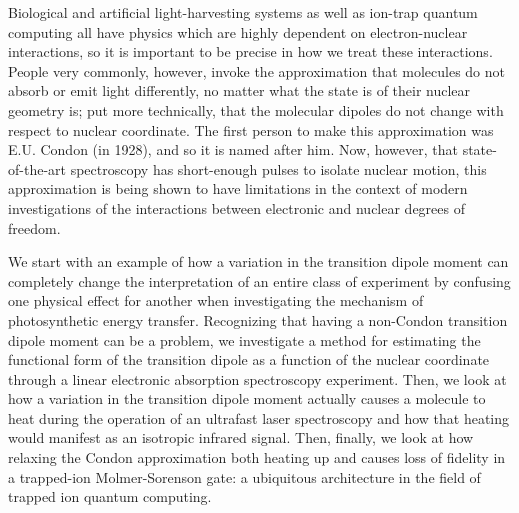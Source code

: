 
Biological and artificial light-harvesting systems as well as ion-trap quantum computing all have physics which are highly dependent on electron-nuclear interactions, so it is important to be precise in how we treat these interactions.  People very commonly, however, invoke the approximation that molecules do not absorb or emit light differently, no matter what the state is of their nuclear geometry is; put more technically, that the molecular dipoles do not change with respect to nuclear coordinate.  The first person to make this approximation was E.U. Condon (in 1928), and so it is named after him.  Now, however, that state-of-the-art spectroscopy has short-enough pulses to isolate nuclear motion, this approximation is being shown to have limitations in the context of modern investigations of the interactions between electronic and nuclear degrees of freedom.

We start with an example of how a variation in the transition dipole moment can completely change the interpretation of an entire class of experiment by confusing one physical effect for another when investigating the mechanism of photosynthetic energy transfer.  Recognizing that having a non-Condon transition dipole moment can be a problem, we investigate a method for estimating the functional form of the transition dipole as a function of the nuclear coordinate through a linear electronic absorption spectroscopy experiment.  Then, we look at how a variation in the transition dipole moment actually causes a molecule to heat during the operation of an ultrafast laser spectroscopy and how that heating would manifest as an isotropic infrared signal.  Then, finally, we look at how relaxing the Condon approximation both heating up and causes loss of fidelity in a trapped-ion Molmer-Sorenson gate: a ubiquitous architecture in the field of trapped ion quantum computing.
